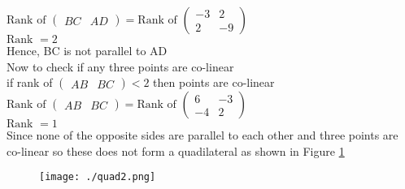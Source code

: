 \documentclass[12pt]{article}
\newcommand{\myvec}[1]{\ensuremath{\begin{pmatrix}#1\end{pmatrix}}}
\begin{document}
\begin{enumerate}
	$\text{Rank of } \myvec{BC & AD} = \text{Rank of }\myvec{-3&2\\2&-9}$\\
	$\text{Rank } = 2$\\
	Hence, BC is not parallel to AD\\
	Now to check if any three points are co-linear\\
	if rank of $\myvec{AB & BC} < 2$ then points are co-linear\\
	$\text{Rank of }\myvec{AB & BC} = \text{Rank of }\myvec{6&-3\\-4&2}$\\
	$\text{Rank } = 1$\\
	Since none of the opposite sides are parallel to each other and three points are co-linear so these does not form a quadilateral as shown in Figure \ref{fig:Fig2}\\
	
\begin{figure}[!h]
	\begin{center} 
	    \texttt{[image: ./quad2.png]}
	\end{center}
\caption{}
\label{fig:Fig2}
\end{figure}
	

\end{enumerate}
\end{document}
